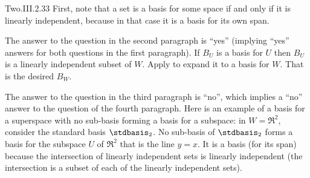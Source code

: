 \begin{ans}{Two.III.2.33}
       First, note that a set is a basis for some space if and only
       if it is linearly independent, because in that case
       it is a basis for its own span.
       \begin{exparts}
         \partsitem The answer to the question in the second paragraph
            is ``yes''
           (implying ``yes'' answers for both questions in the first
           paragraph).
           If \( B_U \) is a basis for \( U \) then
           \( B_U \) is a linearly independent subset of \( W \).
           Apply  to expand it to a basis for
           \( W \).
           That is the desired \( B_W \).

           The answer to the question in the third paragraph is ``no'', which
           implies a ``no'' answer to the question of the fourth paragraph.
           Here is an example of a basis for a superspace with no sub-basis
           forming a basis for a subspace: in \( W=\Re^2 \), consider the
           standard basis \( \stdbasis_2 \).
           No sub-basis of $\stdbasis_2$ forms a basis for the
           subspace \( U \)
           of $\Re^2$ that is the line \( y=x \).
         \partsitem It is a basis (for its span) because the
           intersection of linearly
           independent sets is linearly independent (the intersection is a
           subset of each of the linearly independent sets).


\end{exparts}
\end{ans}
